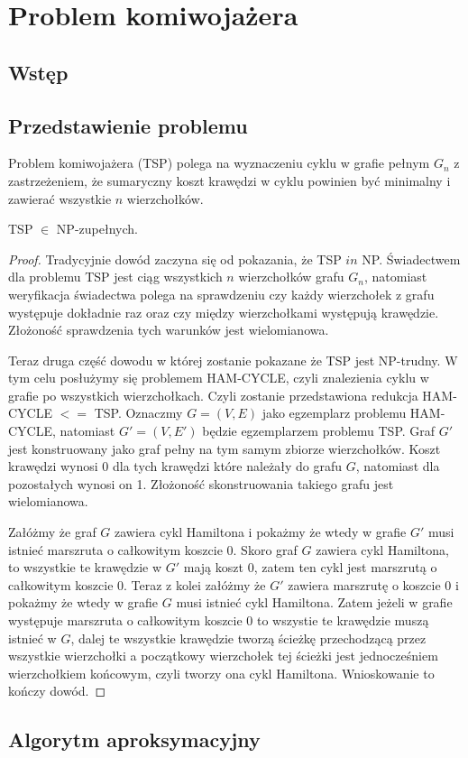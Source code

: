 \chapter{Problem komiwojażera}

\section{Wstęp}

\section{Przedstawienie problemu}

Problem komiwojażera (TSP) polega na wyznaczeniu cyklu w grafie pełnym $G_{n}$ z zastrzeżeniem, że sumaryczny koszt krawędzi w cyklu powinien być minimalny i zawierać wszystkie $n$ wierzchołków.  

\begin{twr}
TSP $\in$ NP-zupełnych.
\end{twr}


\begin{proof}

Tradycyjnie dowód zaczyna się od pokazania, że TSP $in$ NP. Świadectwem dla problemu TSP jest ciąg wszystkich $n$ wierzchołków grafu $G_{n}$, natomiast weryfikacja świadectwa polega na sprawdzeniu czy każdy wierzchołek z grafu występuje dokładnie raz oraz czy między wierzchołkami występują krawędzie. Złożoność sprawdzenia tych warunków jest wielomianowa.

Teraz druga część dowodu w której zostanie pokazane że TSP jest NP-trudny. W tym celu posłużymy się problemem HAM-CYCLE, czyli znalezienia cyklu w grafie po wszystkich wierzchołkach. Czyli zostanie przedstawiona redukcja HAM-CYCLE $<=$ TSP. Oznaczmy $G=(V,E)$ jako egzemplarz problemu  HAM-CYCLE, natomiast $G'=(V,E')$ będzie egzemplarzem problemu TSP. Graf $G'$ jest konstruowany jako graf pełny na tym samym zbiorze wierzchołków. Koszt krawędzi wynosi 0 dla tych krawędzi które należały do grafu $G$, natomiast dla pozostałych wynosi on 1. Złożoność skonstruowania takiego grafu jest wielomianowa.

Załóżmy że graf $G$ zawiera cykl Hamiltona i pokażmy że wtedy w grafie $G'$ musi istnieć marszruta o całkowitym koszcie 0. Skoro graf $G$ zawiera cykl Hamiltona, to wszystkie te krawędzie w $G'$ mają koszt 0, zatem ten cykl jest marszrutą o całkowitym koszcie 0.
Teraz z kolei załóżmy że $G'$ zawiera marszrutę o koszcie 0 i pokażmy że wtedy w grafie $G$ musi istnieć cykl Hamiltona. Zatem jeżeli w grafie występuje marszruta o całkowitym koszcie 0 to wszystie te krawędzie muszą istnieć w $G$, dalej te wszystkie krawędzie tworzą ścieżkę przechodzącą przez wszystkie wierzchołki a początkowy wierzchołek tej ścieżki jest jednocześniem wierzchołkiem końcowym, czyli tworzy ona cykl Hamiltona. Wnioskowanie to kończy dowód.

\end{proof}


\section{Algorytm aproksymacyjny}